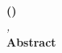 {
\centering
{\Large \textbf{\Topic{}}}\\
\vspace{3mm}
\textrm{\textbf{\Name{} (\RollNo{})}}\\
\vspace{2mm}
\textrm{\textit{\Department{}, \College{}}}\\
\vspace{5mm}
\textrm{\textbf{Abstract}}\\
}

\vspace{10mm}
